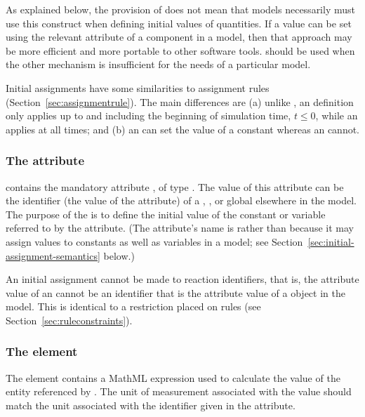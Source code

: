 As explained below, the provision of \InitialAssignment does not
mean that models necessarily must use this construct when defining
initial values of quantities.  If a value can be set
using the relevant attribute of a component in a model, then
that approach may be more efficient and more portable to other
software tools.  \InitialAssignment should be used when the other
mechanism is insufficient for the needs of a particular model.

Initial assignments have some similarities to assignment rules
(Section~\ref{sec:assignmentrule}).  The main differences are (a)
unlike \AssignmentRule, an \InitialAssignment definition only
applies up to and including the beginning of simulation time, \ie
$t \leq 0$, while an \AssignmentRule applies at all times; and (b)
an \InitialAssignment can set the value of a constant whereas an
\AssignmentRule cannot.


\subsubsection{The  attribute}

\InitialAssignment contains the mandatory attribute
, of type .  The value of this
attribute can be the identifier (\ie the value of the 
attribute) of a \Compartment, \Species, \SpeciesReference or
global \Parameter elsewhere in the model.  The purpose of the
\InitialAssignment is to define the initial value of the constant
or variable referred to by the  attribute.  (The
attribute's name is  rather than 
because it may assign values to constants as well as variables in
a model; see Section~\ref{sec:initial-assignment-semantics}
below.)

An initial assignment cannot be made to reaction identifiers, that
is, the  attribute value of an \InitialAssignment cannot
be an identifier that is the  attribute value of a \Reaction
object in the model.  This is identical to a restriction placed on
rules (see Section~\ref{sec:ruleconstraints}).


\subsubsection{The  element}

The  element contains a MathML expression used to
calculate the value of the entity referenced by .
The unit of measurement associated with the value should match the
unit associated with the identifier given in the 
attribute.


